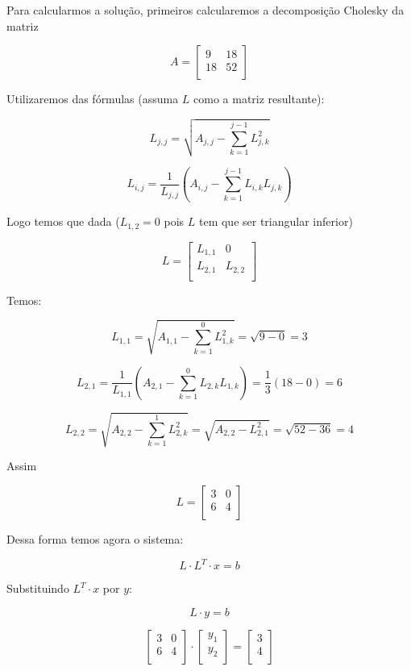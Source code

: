 \documentclass[11pt]{article}
\begin{document}
\begin{exerc}
\begin{enumerate}
Para calcularmos a solução, primeiros calcularemos a decomposição Cholesky da matriz

$$
A = \begin{bmatrix}
	9 & 18\\
	18 & 52\\
\end{bmatrix}
$$

Utilizaremos das fórmulas (assuma $L$ como a matriz resultante):

$$L_{j, j} = \sqrt{A_{j,j} - \sum_{k = 1}^{j - 1}L_{j, k}^2}$$

$$L_{i, j} = \frac{1}{L_{j, j}}(A_{i, j} - \sum_{k = 1}^{j - 1}L_{i, k}L_{j, k})$$

Logo temos que dada ($L_{1, 2} = 0$ pois $L$ tem que ser triangular inferior)

$$
L = \begin{bmatrix}
	L_{1, 1} & 0\\
	L_{2, 1} & L_{2, 2}\\
\end{bmatrix}
$$

Temos:

$$L_{1, 1} = \sqrt{A_{1, 1} - \sum_{k = 1}^{0}L_{1, k}^2} = \sqrt{9 - 0} = 3$$

$$L_{2, 1} = \frac{1}{L_{1, 1}} (A_{2, 1} - \sum_{k = 1}^{0}L_{2, k}L_{1, k}) = \frac{1}{3}(18 - 0) = 6$$

$$L_{2, 2} = \sqrt{A_{2,2} - \sum_{k = 1}^{1}L_{2, k}^2} = \sqrt{A_{2,2} - L_{2, 1}^2} = \sqrt{52 - 36} = 4$$

Assim

$$
L = \begin{bmatrix}
	3 & 0\\
	6 & 4\\
\end{bmatrix}
$$

Dessa forma temos agora o sistema:

$$L \cdot L^T \cdot x = b$$

Substituindo $L^T \cdot x$ por $y$:

$$L \cdot y = b$$

$$
\begin{bmatrix}
	3 & 0\\
	6 & 4\\
\end{bmatrix}
\cdot
\begin{bmatrix}
	y_1\\
	y_2\\
\end{bmatrix}
=
\begin{bmatrix}
	3\\
	4\\
\end{bmatrix}
$$


\end{enumerate}
\end{exerc}
\end{document}
